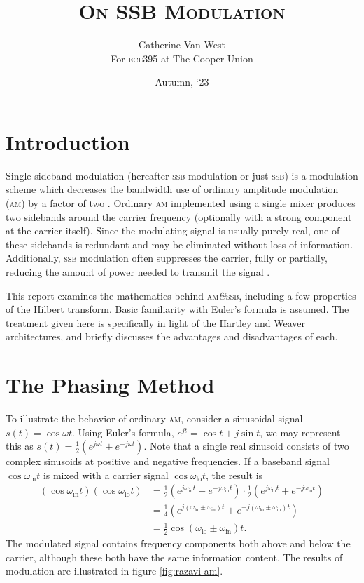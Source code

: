 \documentclass[12pt]{article}
\title{\textsc{On SSB Modulation}}
\author{\vspace{-.8em} Catherine Van West \\
	\normalsize For \textsc{ece395} at The Cooper Union}
\date{Autumn, `23}
\newcommand{\amp}{\textit{\&}\xspace}
\newcommand{\am}{\textsc{am}\xspace}
\newcommand{\ssb}{\textsc{ssb}\xspace}
\begin{document}
\maketitle

\section*{Introduction}
Single-sideband modulation (hereafter \ssb modulation or just \ssb) is a
modulation scheme which decreases the bandwidth use of ordinary amplitude
modulation (\am) by a factor of two \autocite{ssb-thaddeus}. Ordinary \am
implemented using a single mixer produces two sidebands around the carrier
frequency (optionally with a strong component at the carrier itself). Since the
modulating signal is usually purely real, one of these sidebands is redundant
and may be eliminated without loss of information. Additionally, \ssb
modulation often suppresses the carrier, fully or partially, reducing the
amount of power needed to transmit the signal \autocite{weaver-rowell}.

This report examines the mathematics behind \am \amp \ssb, including a few
properties of the Hilbert transform. Basic familiarity with Euler's formula is
assumed. The treatment given here is specifically in light of the Hartley and
Weaver architectures, and briefly discusses the advantages and disadvantages of
each.

\section*{The Phasing Method}

\newcommand{\oin}{\omega_\text{in}}
\newcommand{\olo}{\omega_\text{lo}}

To illustrate the behavior of ordinary \am, consider a sinusoidal signal \(s(t)
= \cos \omega t\). Using Euler's formula, \(e^{jt} = \cos t + j \sin t\), we
may represent this as \(s(t) = \frac 1 2 (e^{j \omega t} + e^{- j \omega t})\).
Note that a single real sinusoid consists of two complex sinusoids at positive
and negative frequencies. If a baseband signal \(\cos \oin t\) is mixed with a
carrier signal \(\cos \olo t\), the result is
\begin{align*}
	\left(\cos \oin t\right) \left(\cos \olo t\right)
		&= \frac 1 2 \left(e^{j \oin t} + e^{-j \oin t}\right)
			\cdot \frac 1 2 \left(
				e^{j \olo t} + e^{-j \olo t}
			\right) \\
		&= \frac 1 4 \left(
			e^{j (\olo \pm \oin) t} + e^{-j (\olo \pm \oin) t}
		\right) \\
		&= \frac 1 2 \cos (\olo \pm \oin) t.
\end{align*}
The modulated signal contains frequency components both above and below the
carrier, although these both have the same information content. The results of
modulation are illustrated in figure \ref{fig:razavi-am}.
\end{document}
